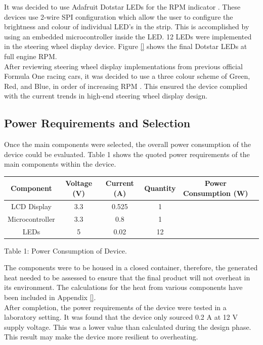 \documentclass[a4paper,12pt]{article}
\begin{document}
It was decided to use Adafruit Dotstar LEDs for the RPM indicator \cite{dotstar_datasheet}. These devices use 2-wire SPI configuration which allow the user to configure the brightness and colour of individual LED’s in the strip. This is accomplished by using an embedded microcontroller inside the LED. 12 LEDs were implemented in the steering wheel display device. Figure \ref{} shows the final Dotstar LEDs at full engine RPM. \\

After reviewing steering wheel display implementations from previous official Formula One racing cars, it was decided to use a three colour scheme of Green, Red, and Blue, in order of increasing RPM \cite{bsim_racing, daily_mail_1}. This ensured the device complied with the current trends in high-end steering wheel display design.

\subsection{Power Requirements and Selection}
\label{sec:PSU}

Once the main components were selected, the overall power consumption of the device could be evaluated. Table 1 shows the quoted power requirements of the main components within the device.

\begin{center}
\begin{tabular}{ | c | c | c | c | c | c | }
\hline
 Component & Voltage (V) & Current (A) & Quantity & Power Consumption (W) \\
\hline
 LCD Display & 3.3 & 0.525 & 1 & \\
\hline
 Microcontroller & 3.3 & 0.8 & 1 & \\
\hline
 LEDs & 5 & 0.02 & 12 & \\
\hline
\end{tabular}
\par
\bigskip
Table 1: Power Consumption of Device.
\end{center}

The components were to be housed in a closed container, therefore, the generated heat needed to be assessed to ensure that the final product will not overheat in its environment. The calculations for the heat from various components have been included in Appendix \ref{}. \\

After completion, the power requirements of the device were tested in a laboratory setting. It was found that the device only sourced 0.2 A at 12 V supply voltage. This was a lower value than calculated during the design phase. This result may make the device more resilient to overheating.

\newpage


\end{document}

